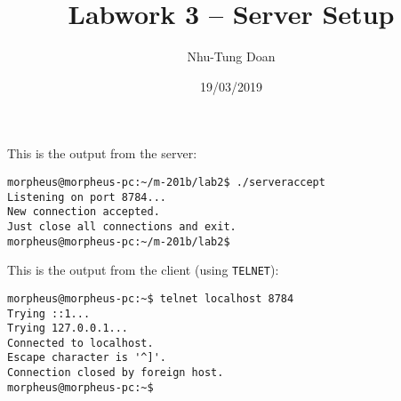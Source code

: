 \documentclass[12pt]{article}
\title{Labwork 3 -- Server Setup}
\author{Nhu-Tung Doan}
\date{19/03/2019}
\begin{document}
\maketitle

This is the output from the server:

\begin{verbatim}
morpheus@morpheus-pc:~/m-201b/lab2$ ./serveraccept 
Listening on port 8784...
New connection accepted.
Just close all connections and exit.
morpheus@morpheus-pc:~/m-201b/lab2$
\end{verbatim}

This is the output from the client (using \texttt{TELNET}):

\begin{verbatim}
morpheus@morpheus-pc:~$ telnet localhost 8784
Trying ::1...
Trying 127.0.0.1...
Connected to localhost.
Escape character is '^]'.
Connection closed by foreign host.
morpheus@morpheus-pc:~$ 
\end{verbatim}
\end{document}
